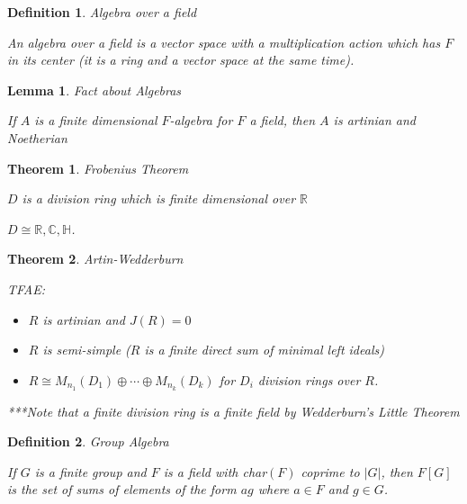 \documentclass[12pt]{Qual}
\newtheorem{theorem}{Theorem}
\newtheorem{definition}{Definition}
\newtheorem{lemma}{Lemma}
\begin{document}
\begin{definition}{\Large\textit{Algebra over a field}}
$\,$

An algebra over a field is a vector space with a multiplication action which has $F$ in its center (it is a ring and a vector space at the same time).

\end{definition}
\vspace{0.5cm}
\begin{lemma}{\Large\textit{Fact about Algebras}}

 If $A$ is a finite dimensional $F$-algebra for $F$ a field, then $A$ is artinian and Noetherian

\end{lemma}
\vspace{0.5cm}
\begin{theorem}{\Large\textit{Frobenius Theorem}}

 $D$ is a division ring which is finite dimensional over $\mathbb{R}$

 $D\cong\mathbb{R},\mathbb{C},\mathbb{H}$.

\end{theorem}
\newpage
\begin{theorem}{\Large\textit{Artin-Wedderburn}}

TFAE:

\begin{itemize}[leftmargin=2.5cm]
\renewcommand\labelitemi{\faPuzzlePiece}
    \item $R$ is artinian and $J(R)=0$
    \item $R$ is semi-simple ($R$ is a finite direct sum of minimal left ideals)
    \item $R\cong M_{n_1}(D_1)\oplus\cdots\oplus M_{n_k}(D_k)$ for $D_i$ division rings over $R$.
\end{itemize}

\begin{mybox}
***Note that a finite division ring is a finite field by Wedderburn's Little Theorem
\end{mybox}

\end{theorem}
\vspace{0.5cm}
\begin{definition}{\Large\textit{Group Algebra}}
$\,$

If $G$ is a finite group and $F$ is a field with char$(F)$ coprime to $|G|$, then $F[G]$ is the set of sums of elements of the form $ag$ where $a\in F$ and $g\in G$.

\end{definition}
\end{document}
